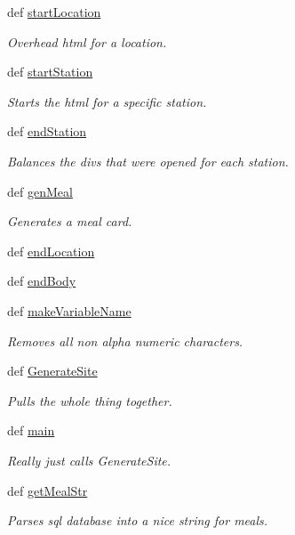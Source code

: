 \begin{DoxyCompactItemize}
def \hyperlink{namespacecode_a16f138feb62f5c14599aabc9cc3cb7e4}{start\-Location}
\begin{DoxyCompactList}\small\item\em Overhead html for a location. \end{DoxyCompactList}\item 
def \hyperlink{namespacecode_acbccb2d9d133e86519cb215b7f9d232b}{start\-Station}
\begin{DoxyCompactList}\small\item\em Starts the html for a specific station. \end{DoxyCompactList}\item 
def \hyperlink{namespacecode_a746b3c361d20cb299f2d23f97ee10fb0}{end\-Station}
\begin{DoxyCompactList}\small\item\em Balances the divs that were opened for each station. \end{DoxyCompactList}\item 
def \hyperlink{namespacecode_a2c52dc22f18c267737cf02d2c7a993fd}{gen\-Meal}
\begin{DoxyCompactList}\small\item\em Generates a meal card. \end{DoxyCompactList}\item 
def \hyperlink{namespacecode_af22e585220154cf6f605f0ef7ba37300}{end\-Location}
\item 
def \hyperlink{namespacecode_a135931d367dc114c5040371519203dee}{end\-Body}
\item 
def \hyperlink{namespacecode_aade8af14ce2bb501d6434723ac2a40dd}{make\-Variable\-Name}
\begin{DoxyCompactList}\small\item\em Removes all non alpha numeric characters. \end{DoxyCompactList}\item 
def \hyperlink{namespacecode_a7b5ff74ae6ecd9e7896ab37d2f86d72d}{Generate\-Site}
\begin{DoxyCompactList}\small\item\em Pulls the whole thing together. \end{DoxyCompactList}\item 
def \hyperlink{namespacecode_abca6883605857cac25d75925e02e08d2}{main}
\begin{DoxyCompactList}\small\item\em Really just calls Generate\-Site. \end{DoxyCompactList}\item 
def \hyperlink{namespacecode_ab353288cd73caf7523ee53cf9928bd12}{get\-Meal\-Str}
\begin{DoxyCompactList}\small\item\em Parses sql database into a nice string for meals. \end{DoxyCompactList}\end{DoxyCompactItemize}


